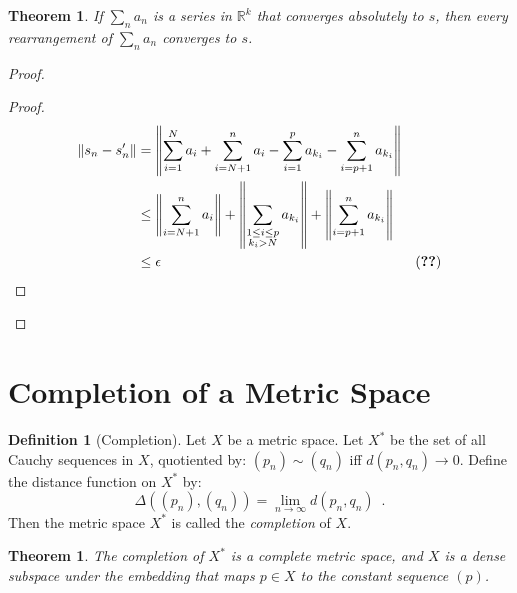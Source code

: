 \documentclass{book}
\let\qed\relax
\newtheorem{thm}[prop]{Theorem}
\theoremstyle{definition}
\newtheorem{df}[prop]{Definition}
\begin{document}
\begin{thm}
If $\sum_n a_n$ is a series in $\mathbb{R}^k$ that converges absolutely to $s$, then every rearrangement of $\sum_n a_n$ converges to $s$.
\end{thm}

\begin{proof}
\pf
{}
\begin{proof}
	\pf
	\begin{align*}
		\|s_n - s_n'\| & = \left\| \sum_{i=1}^N a_i + \sum_{i=N+1}^n a_i - \sum_{i=1}^p a_{k_i} - \sum_{i=p+1}^n a_{k_i} \right\| \\
		& \leq \left\| \sum_{i=N+1}^n a_i \right\| + \left\| \sum_{
		\substack{1 \leq i \leq p \\ k_i > N}} a_{k_i} \right\| + \left\| \sum_{i=p+1}^n a_{k_i} \right\| \\
		& \leq \epsilon & (\text{\stepref{3}})
	\end{align*}
\end{proof}
\qed
\end{proof}

\section{Completion of a Metric Space}

\begin{df}[Completion]
Let $X$ be a metric space. Let $X^*$ be the set of all Cauchy sequences in $X$, quotiented by: $(p_n) \sim (q_n)$ iff $d(p_n, q_n) \rightarrow 0$. Define the distance function on $X^*$ by:
\[ \Delta((p_n),(q_n)) = \lim_{n \rightarrow \infty} d(p_n, q_n) \enspace . \]
Then the metric space $X^*$ is called the \emph{completion} of $X$.
\end{df}

\begin{thm}
The completion of $X^*$ is a complete metric space, and $X$ is a dense subspace under the embedding that maps $p \in X$ to the constant sequence $(p)$.
\end{thm}

\end{document}
